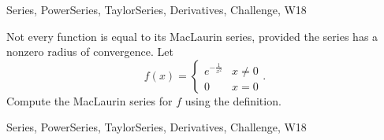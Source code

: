  

\begin{tagblock}{Series, PowerSeries, TaylorSeries, Derivatives, Challenge, W18}
\begin{question}

Not every function is equal to its MacLaurin series, provided the series has a nonzero radius of convergence. Let 
\[
f(x)=\begin{cases} e^{-\frac 1 {x^2}} & x\ne 0 \\ 0 & x=0\end{cases}.
\]
Compute the MacLaurin series for $f$ using the definition.
	
	
\begin{tags}
	    Series, PowerSeries, TaylorSeries, Derivatives, Challenge, W18
\end{tags}
	
\begin{diary}
	    
\end{diary}
	
\begin{solution}
	   
\end{solution}
	
\end{question}

\end{tagblock}

